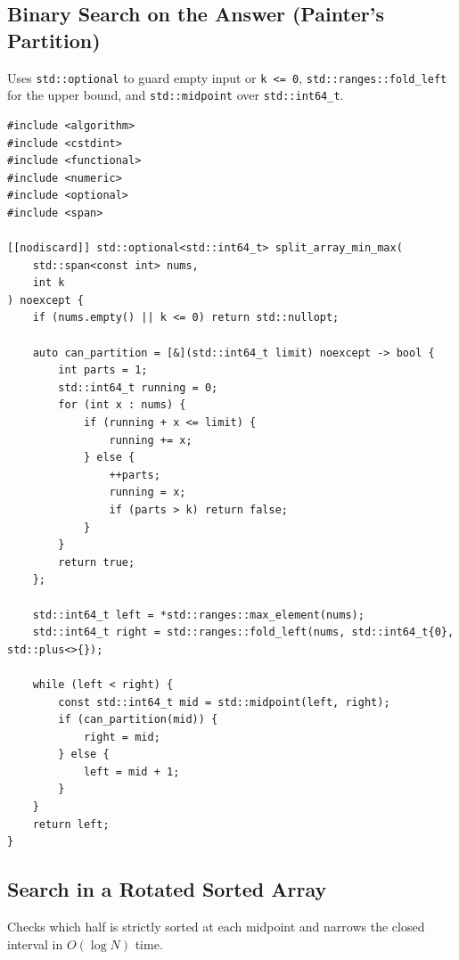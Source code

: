 \documentclass[11pt,a4paper]{article}
\theoremstyle{definition}
\begin{document}
\subsection{Binary Search on the Answer (Painter's Partition)}
Uses \texttt{std::optional} to guard empty input or \texttt{k <= 0}, \texttt{std::ranges::fold\_left} for the upper bound, and \texttt{std::midpoint} over \texttt{std::int64\_t}.

\begin{lstlisting}[caption={Minimizing maximum partition sum using C++23 ranges and std::midpoint}]
#include <algorithm>
#include <cstdint>
#include <functional>
#include <numeric>
#include <optional>
#include <span>

[[nodiscard]] std::optional<std::int64_t> split_array_min_max(
    std::span<const int> nums,
    int k
) noexcept {
    if (nums.empty() || k <= 0) return std::nullopt;

    auto can_partition = [&](std::int64_t limit) noexcept -> bool {
        int parts = 1;
        std::int64_t running = 0;
        for (int x : nums) {
            if (running + x <= limit) {
                running += x;
            } else {
                ++parts;
                running = x;
                if (parts > k) return false;
            }
        }
        return true;
    };

    std::int64_t left = *std::ranges::max_element(nums);
    std::int64_t right = std::ranges::fold_left(nums, std::int64_t{0}, std::plus<>{});

    while (left < right) {
        const std::int64_t mid = std::midpoint(left, right);
        if (can_partition(mid)) {
            right = mid;
        } else {
            left = mid + 1;
        }
    }
    return left;
}
\end{lstlisting}

\subsection{Search in a Rotated Sorted Array}
Checks which half is strictly sorted at each midpoint and narrows the closed interval in $O(\log N)$ time.
\end{document}
